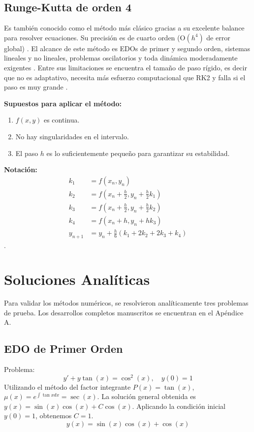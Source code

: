 	\section{Runge-Kutta de orden 4}
	Es también conocido como el método más clásico gracias a su excelente balance para resolver ecuaciones. Su precisión es de cuarto orden (O$(h^{4})$ de error global) \parencite{zill2018}. El alcance de este método es EDOs de primer y segundo orden, sistemas lineales y no lineales, problemas oscilatorios y toda dinámica moderadamente exigentes \parencite{zill2018}. Entre sus limitaciones se encuentra el tamaño de paso rígido, es decir que no es adaptativo, necesita más esfuerzo computacional que RK2 y falla si el paso es muy grande \parencite{zill2018}.
	
	\textbf{Supuestos para aplicar el método:}
	\begin{enumerate}
		\item $f(x,y)$ es continua.
		\item No hay singularidades en el intervalo.
		\item El paso $h$ es lo suficientemente pequeño para garantizar su estabilidad.
	\end{enumerate}
	
	\textbf{Notación:}
	\begin{align}
		k_{1} &= f(x_{n},y_{n}) \\
		k_{2} &= f\left(x_{n}+\frac{h}{2},y_{n}+\frac{h}{2}k_{1}\right) \\
		k_{3} &= f\left(x_{n}+\frac{h}{2},y_{n}+\frac{h}{2}k_{2}\right) \\
		k_{4} &= f(x_{n}+h,y_{n}+hk_{3}) \\
		y_{n+1} &= y_{n}+\frac{h}{6}(k_{1}+2k_{2}+2k_{3}+k_{4})
	\end{align}
	\textcite{zill2018}.
	
	\chapter{Soluciones Analíticas}
	Para validar los métodos numéricos, se resolvieron analíticamente tres problemas de prueba. Los desarrollos completos manuscritos se encuentran en el Apéndice A.
	
	\section{EDO de Primer Orden}
	Problema:
	\begin{equation}
		y' + y \tan(x) = \cos^2(x), \quad y(0)=1
	\end{equation}
	Utilizando el método del factor integrante $P(x) = \tan(x)$, $\mu(x) = e^{\int \tan x dx} = \sec(x)$.
	La solución general obtenida es $y(x) = \sin(x)\cos(x) + C\cos(x)$.
	Aplicando la condición inicial $y(0)=1$, obtenemos $C=1$.
	\begin{equation}
		\boxed{y(x) = \sin(x)\cos(x) + \cos(x)}
	\end{equation}
	
